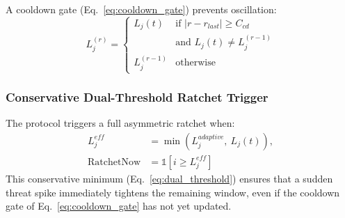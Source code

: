 \documentclass[journal, 10pt, twocolumn]{IEEEtran}
\begin{document}
A cooldown gate (Eq.~\eqref{eq:cooldown_gate}) prevents oscillation:
\begin{equation}
L_j^{(r)} \!=\! \begin{cases} L_j(t) & \!\text{if } |r\!-\!r_{last}| \!\geq\! C_{cd} \\ & \text{and } L_j(t) \!\neq\! L_j^{(r-1)} \\ L_j^{(r-1)} & \!\text{otherwise} \end{cases}
\label{eq:cooldown_gate}
\end{equation}

\subsubsection{Conservative Dual-Threshold Ratchet Trigger}


The protocol triggers a full asymmetric ratchet when:
\begin{equation}
\begin{split}
L_j^{eff} &= \min\!\left(L_j^{adaptive},\ L_j(t)\right), \\
\text{RatchetNow} &= \mathbb{1}\!\left[i \geq L_j^{eff}\right]
\end{split}
\label{eq:dual_threshold}
\end{equation}
This conservative minimum (Eq.~\eqref{eq:dual_threshold}) ensures that a sudden threat spike immediately tightens the remaining window, even if the cooldown gate of Eq.~\eqref{eq:cooldown_gate} has not yet updated.
\end{document}
